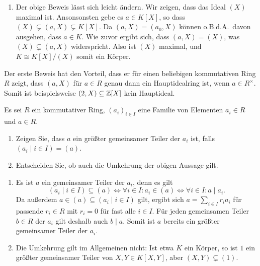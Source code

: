 \begin{solution}
\begin{enumerate}
    \item
      Der obige Beweis lässt sich leicht ändern.
      Wir zeigen, dass das Ideal $(X)$ maximal ist.
      Ansonsonsten gebe es $a \in K[X]$, so dass $(X) \subsetneq (a, X) \subsetneq K[X]$.
      Da $(a, X) = (a_0, X)$ können o.B.d.A.\ davon ausgehen, dass $a \in K$.
      Wie zuvor ergibt sich, dass $(a, X) = (X)$, was $(X) \subsetneq (a,X)$ widerspricht.
      Also ist $(X)$ maximal, und $K \cong K[X]/(X)$ somit ein Körper.
  \end{enumerate}
  Der erste Beweis hat den Vorteil, dass er für einen beliebigen kommutativen Ring $R$ zeigt, dass $(a, X)$ für $a \in R$ genau dann ein Hauptidealring ist, wenn $a \in R^\times$.
  Somit ist beispielsweise $(2, X) \subseteq \mathbb{Z}[X]$ kein Hauptideal.
\end{solution}


\begin{question}
  Es sei $R$ ein kommutativer Ring, $(a_i)_{i \in I}$ eine Familie von Elementen $a_i \in R$ und $a \in R$.
  \begin{enumerate}
    \item
      Zeigen Sie, dass $a$ ein größter gemeinsamer Teiler der $a_i$ ist, falls $(a_i \mid i \in I) = (a)$.
    \item
      Entscheiden Sie, ob auch die Umkehrung der obigen Aussage gilt.
  \end{enumerate}
\end{question}


\begin{question}
  \begin{enumerate}
    \item
      Es ist $a$ ein gemeinsamer Teiler der $a_i$, denn es gilt
      \[
              (a_i \mid i \in I) \subseteq (a)
        \iff  \forall i \in I: a_i \in (a)
        \iff  \forall i \in I: a \mid a_i.
      \]
      Da außerdem $a \in (a) \subseteq (a_i \mid i \in I)$ gilt, ergibt sich $a = \sum_{i \in I} r_i a_i$ für passende $r_i \in R$ mit $r_i = 0$ für fast alle $i \in I$.
      Für jeden gemeinsamen Teiler $b \in R$ der $a_i$ gilt deshalb auch $b \mid a$.
      Somit ist $a$ bereits ein größter gemeinsamer Teiler der $a_i$.
    \item
      Die Umkehrung gilt im Allgemeinen nicht:
      Ist etwa $K$ ein Körper, so ist $1$ ein größter gemeinsamer Teiler von $X, Y \in K[X, Y]$, aber $(X, Y) \subsetneq (1)$.
  \end{enumerate}
\end{question}


